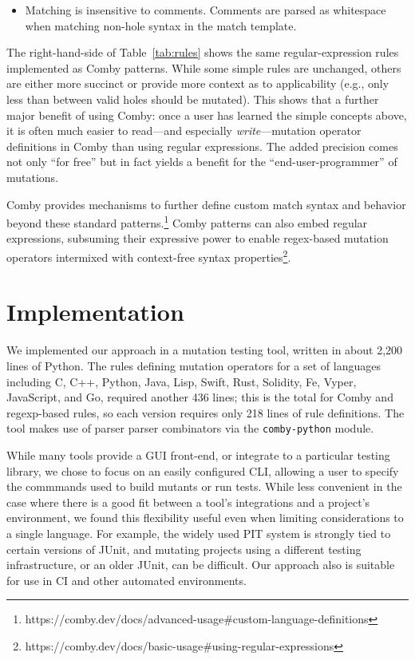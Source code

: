 \documentclass[sigconf,review, anonymous]{acmart}
\begin{document}
{\begin{itemize}
\item Matching is insensitive to comments. Comments are parsed as whitespace when matching non-hole syntax in the match template.

\end{itemize}

The right-hand-side of Table~\ref{tab:rules} shows the same regular-expression rules 
implemented as Comby patterns.  While some simple rules are
unchanged, others are either more succinct or provide more context as
to applicability (e.g., only less than between valid holes should be
mutated).  This shows that a
further major benefit of using Comby: once a user has learned
the simple concepts above, it is often much easier to read---and
especially \emph{write}---mutation
operator definitions in Comby than using regular expressions.  The
added precision comes not only ``for free'' but in fact yields a
benefit for the ``end-user-programmer'' of mutations.

Comby provides mechanisms to further define custom match syntax and behavior
beyond these standard patterns.\footnote{https://comby.dev/docs/advanced-usage\#custom-language-definitions} Comby patterns can also embed regular expressions, subsuming their
expressive power to enable regex-based mutation operators intermixed with
context-free syntax
properties\footnote{https://comby.dev/docs/basic-usage\#using-regular-expressions}.

\section{Implementation}
\label{sec:imp}

We implemented our approach in a mutation testing tool, written in
about 2,200 lines of Python.  The rules defining mutation operators
for a set of languages including C, C++, Python, Java, Lisp, Swift,
Rust, Solidity, Fe, Vyper, JavaScript, and Go, required another 436
lines; this is the total for Comby and regexp-based rules, so each
version requires only 218 lines of rule definitions.  The tool makes
use of parser parser combinators via the {\tt comby-python} module.

While many tools provide a GUI front-end, or integrate to a particular
testing library, we chose to focus on an easily configured CLI,
allowing a user to specify the commmands used to build mutants or
run tests.  While less convenient in the case where there is a good
fit between a tool's integrations and a project's environment, we
found this flexibility useful even when limiting considerations to a
single language.  For example, the widely used PIT system is strongly tied to
certain versions of JUnit, and mutating projects using a different
testing infrastructure, or an older JUnit, can be difficult.  Our
approach also is suitable for use in CI and other automated
environments.

}
\end{document}
